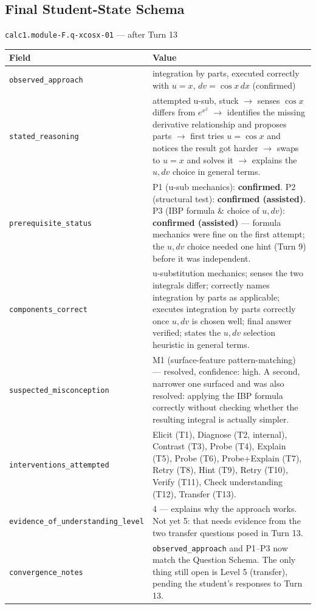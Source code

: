 \documentclass[11pt]{article}
\begin{document}
\subsection{Final Student-State Schema}

\begin{statebox}{\texttt{calc1.module-F.q-xcosx-01} --- after Turn 13}
\small
\begin{tabularx}{\linewidth}{P{4.0cm} X}
\toprule
\textbf{Field} & \textbf{Value} \\
\midrule
\texttt{observed\_\allowbreak approach} & integration by parts, executed correctly
  with $u=x$, $dv=\cos x\,dx$ (confirmed) \\
\texttt{stated\_\allowbreak reasoning} & attempted u-sub, stuck $\to$ senses
  $\cos x$ differs from $e^{x^2}$ $\to$ identifies the missing derivative
  relationship and proposes parts $\to$ first tries $u=\cos x$ and notices
  the result got harder $\to$ swaps to $u=x$ and solves it $\to$ explains
  the $u,dv$ choice in general terms. \\
\texttt{prerequisite\_\allowbreak status} &
  P1 (u-sub mechanics): \textbf{confirmed}. \newline
  P2 (structural test): \textbf{confirmed (assisted)}. \newline
  P3 (IBP formula \& choice of $u,dv$): \textbf{confirmed (assisted)}
  --- formula mechanics were fine on the first attempt; the $u,dv$
  choice needed one hint (Turn 9) before it was independent. \\
\texttt{components\_\allowbreak correct} & u-substitution mechanics; senses the
  two integrals differ; correctly names integration by parts as
  applicable; executes integration by parts correctly once $u,dv$ is
  chosen well; final answer verified; states the $u,dv$ selection
  heuristic in general terms. \\
\texttt{suspected\_\allowbreak misconception} & M1 (surface-feature
  pattern-matching) --- resolved, confidence: high. A second, narrower
  one surfaced and was also resolved: applying the IBP formula correctly
  without checking whether the resulting integral is actually simpler. \\
\texttt{interventions\_\allowbreak attempted} & Elicit (T1), Diagnose (T2,
  internal), Contrast (T3), Probe (T4), Explain (T5), Probe (T6),
  Probe+Explain (T7), Retry (T8), Hint (T9), Retry (T10), Verify (T11),
  Check understanding (T12), Transfer (T13). \\
\texttt{evidence\_\allowbreak of\_\allowbreak understanding\_\allowbreak level} & 4 ---
  explains why the approach works. Not yet 5: that needs evidence from
  the two transfer questions posed in Turn 13. \\
\texttt{convergence\_\allowbreak notes} & \texttt{observed\_\allowbreak approach} and
  P1--P3 now match the Question Schema. The only thing still open is
  Level 5 (transfer), pending the student's responses to Turn 13. \\
\bottomrule
\end{tabularx}
\end{statebox}
\end{document}
